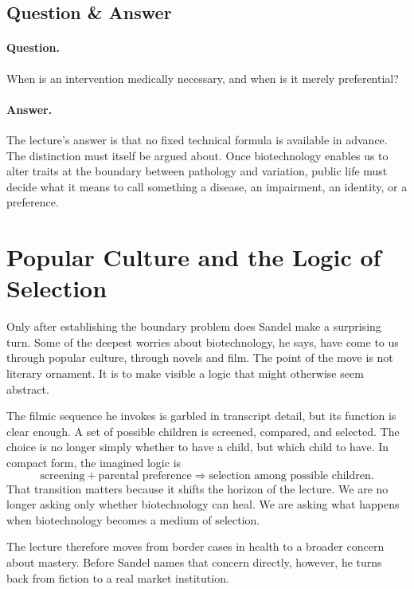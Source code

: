 \subsection{Question \& Answer}

\paragraph{Question.} When is an intervention medically necessary, and when is it merely preferential?

\paragraph{Answer.} The lecture's answer is that no fixed technical formula is available in advance. The distinction must itself be argued about. Once biotechnology enables us to alter traits at the boundary between pathology and variation, public life must decide what it means to call something a disease, an impairment, an identity, or a preference.

\section{Popular Culture and the Logic of Selection}

Only after establishing the boundary problem does Sandel make a surprising turn. Some of the deepest worries about biotechnology, he says, have come to us through popular culture, through novels and film. The point of the move is not literary ornament. It is to make visible a logic that might otherwise seem abstract.

The filmic sequence he invokes is garbled in transcript detail, but its function is clear enough. A set of possible children is screened, compared, and selected. The choice is no longer simply whether to have a child, but which child to have. In compact form, the imagined logic is
\begin{equation}
\text{screening} + \text{parental preference}
\Longrightarrow
\text{selection among possible children}.
\end{equation}
That transition matters because it shifts the horizon of the lecture. We are no longer asking only whether biotechnology can heal. We are asking what happens when biotechnology becomes a medium of selection.

The lecture therefore moves from border cases in health to a broader concern about mastery. Before Sandel names that concern directly, however, he turns back from fiction to a real market institution.

